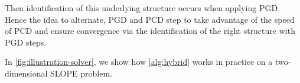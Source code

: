 Then identification of this underlying structure occurs when applying PGD.
Hence the idea to alternate, PGD and PCD step to take advantage of the speed of PCD and ensure convergence via the identification of the right structure with PGD steps.

\begin{algorithm}[htb]
  \caption{%
    Hybrid coordinate descent and proximal gradient descent algorithm
    for SLOPE\label{alg:hybrid}}


  \Return{\(\beta\)}
\end{algorithm}

In \cref{fig:illustration-solver}, we show how \cref{alg:hybrid} works in practice on
a two-dimensional SLOPE problem.

